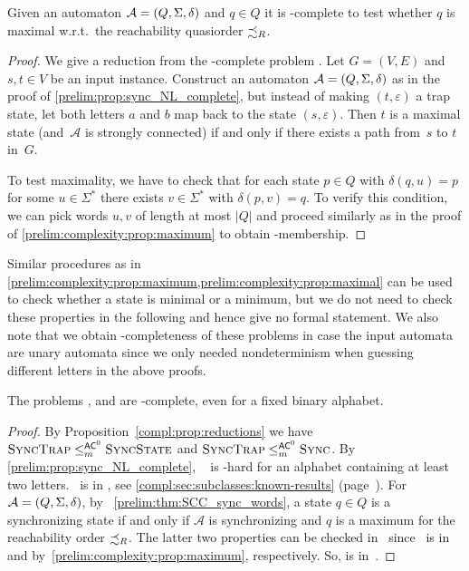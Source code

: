 \begin{proposition}\label{prelim:complexity:prop:maximal}
	Given an automaton $\mathcal A = (Q, \Sigma, \delta)$ and $q \in Q$
	it is \NL-complete to test whether $q$ is maximal w.r.t.~the 
	reachability quasiorder $\precsim_R$.	
\end{proposition}
\begin{proof}
	We give a reduction
	from the \NL-complete problem \TWODAGST.
	Let $G = (V, E)$ and $s, t \in V$ be an input instance.
	Construct an automaton $\mathcal A = (Q, \Sigma, \delta)$
	as in the proof of \cref{prelim:prop:sync_NL_complete},
	but instead of making $(t,\varepsilon)$ a trap state,
	let both letters $a$ and $b$ map back to the state $(s,\varepsilon)$.
	Then $t$ is a maximal state (and~$\mathcal A$
	is strongly connected) if and only if there exists
	a path from~$s$ to $t$ in~$G$.
		
	To test maximality, we have to check
	that for each state $p \in Q$
	with $\delta(q, u) = p$ for some $u \in \Sigma^*$
	there exists $v \in \Sigma^*$
	with $\delta(p, v) = q$.
	To verify this condition, we can pick words $u,v$
	of length at most $|Q|$
	and proceed similarly as in the proof of \cref{prelim:complexity:prop:maximum}
	to obtain \NL-membership.	
\end{proof}

Similar procedures as in \cref{prelim:complexity:prop:maximum,prelim:complexity:prop:maximal}
can be used to check whether a state is minimal or a minimum, but we do not need to check these properties
in the following and hence give no formal statement. We also note that we obtain
\LOGSPACE-completeness of these problems in case the input automata are unary automata
since we only needed nondeterminism when guessing different letters in the above proofs.

\begin{theorem}\label{prelim:complexity:general_aut_sync}
	The problems \DFAS, \DFAST and \DFASS
	are \NL-complete, even for a fixed binary alphabet.
\end{theorem}
\begin{proof} 
	By Proposition~\ref{compl:prop:reductions} 
	we have $\textsc{\sc Sync\-Trap} \le_m^{\textup{\textsf{AC}}^0} \text{\sc Sync\-State}$
	and $\textsc{\sc Sync\-Trap} \le_m^{\textup{\textsf{AC}}^0} \text{\sc Sync}$.
	By \cref{prelim:prop:sync_NL_complete}, \DFAST\   %
	is \NL-hard for an alphabet containing at least two letters.
	\DFAS\ is in \NL, see \cref{compl:sec:subclasses:known-results} (page~\pageref{prelim:classes:intro:SYNC}).
	For $\mathcal A = (Q, \Sigma, \delta)$, by \THM~\ref{prelim:thm:SCC_sync_words},
	a state $q \in Q$
	is a synchronizing state if and only if $\mathcal A$ is synchronizing and $q$ is
	a maximum for the reachability order $\precsim_R$.
	The latter two properties can be checked in \NL\  since \DFAS\ is in \NL and by~\cref{prelim:complexity:prop:maximum}, respectively.
	So, \DFASS is in~\NL.	
\end{proof}

